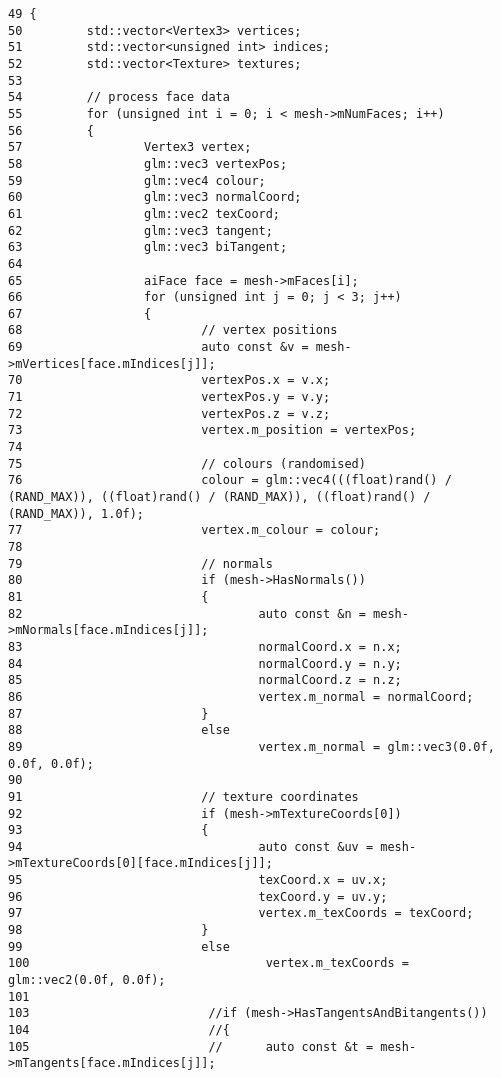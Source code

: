 \begin{Code}\begin{verbatim}49 {
50         std::vector<Vertex3> vertices;
51         std::vector<unsigned int> indices;
52         std::vector<Texture> textures;
53 
54         // process face data
55         for (unsigned int i = 0; i < mesh->mNumFaces; i++)
56         {
57                 Vertex3 vertex;
58                 glm::vec3 vertexPos;
59                 glm::vec4 colour;
60                 glm::vec3 normalCoord;
61                 glm::vec2 texCoord;
62                 glm::vec3 tangent;
63                 glm::vec3 biTangent;
64 
65                 aiFace face = mesh->mFaces[i];
66                 for (unsigned int j = 0; j < 3; j++)
67                 {
68                         // vertex positions
69                         auto const &v = mesh->mVertices[face.mIndices[j]];
70                         vertexPos.x = v.x; 
71                         vertexPos.y = v.y; 
72                         vertexPos.z = v.z;
73                         vertex.m_position = vertexPos;
74 
75                         // colours (randomised)
76                         colour = glm::vec4(((float)rand() / (RAND_MAX)), ((float)rand() / (RAND_MAX)), ((float)rand() / (RAND_MAX)), 1.0f);
77                         vertex.m_colour = colour;
78 
79                         // normals
80                         if (mesh->HasNormals())
81                         {
82                                 auto const &n = mesh->mNormals[face.mIndices[j]];
83                                 normalCoord.x = n.x;
84                                 normalCoord.y = n.y;
85                                 normalCoord.z = n.z;
86                                 vertex.m_normal = normalCoord;
87                         }
88                         else
89                                 vertex.m_normal = glm::vec3(0.0f, 0.0f, 0.0f);
90 
91                         // texture coordinates
92                         if (mesh->mTextureCoords[0])
93                         {
94                                 auto const &uv = mesh->mTextureCoords[0][face.mIndices[j]];
95                                 texCoord.x = uv.x;
96                                 texCoord.y = uv.y;
97                                 vertex.m_texCoords = texCoord;
98                         }
99                         else
100                                 vertex.m_texCoords = glm::vec2(0.0f, 0.0f);
101 
103                         //if (mesh->HasTangentsAndBitangents())
104                         //{
105                         //      auto const &t = mesh->mTangents[face.mIndices[j]];

\end{verbatim}
\end{Code}
